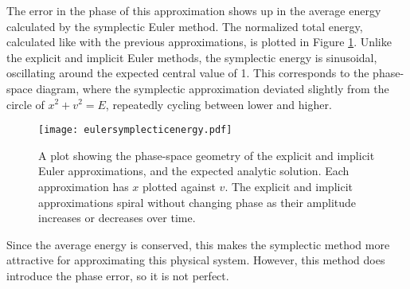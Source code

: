 \documentclass{article}
\begin{document}
The error in the phase of this approximation shows up in the average energy calculated by the symplectic Euler method. The normalized total energy, calculated like with the previous approximations, is plotted in Figure \ref{sympenergy}. Unlike the explicit and implicit Euler methods, the symplectic energy is sinusoidal, oscillating around the expected central value of 1. This corresponds to the phase-space diagram, where the symplectic approximation deviated slightly from the circle of $x^2+v^2=E$, repeatedly cycling between lower and higher. 

\begin{figure}[H]
	\centering
	\texttt{[image: eulersymplecticenergy.pdf]}
	\caption{A plot showing the phase-space geometry of the explicit and implicit Euler approximations, and the expected analytic solution. Each approximation has $x$ plotted against $v$. The explicit and implicit approximations spiral without changing phase as their amplitude increases or decreases over time.}
	\label{sympenergy}
\end{figure}

Since the average energy is conserved, this makes the symplectic method more attractive for approximating this physical system. However, this method does introduce the phase error, so it is not perfect.
\end{document}
